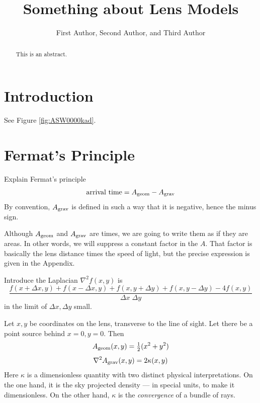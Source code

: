 \documentclass[12pt,preprint]{aastex}
\def\half{{\textstyle\frac12}}
\begin{document}
\title{Something about Lens Models}

\author{First Author,
Second Author, and
Third Author}

\begin{abstract}
This is an abstract.
\end{abstract}

\keywords{}

\section{Introduction}

See Figure \ref{fig:ASW0000kad}.

\section{Fermat's Principle}

Explain Fermat's principle
\begin{equation}
\hbox{arrival time} = A_{\rm geom} - A_{\rm grav}
\end{equation}
By convention, $A_{\rm grav}$ is defined in such a way that it is
negative, hence the minus sign.

Although $A_{\rm geom}$ and $A_{\rm grav}$ are times, we are going to
write them as if they are areas.  In other words, we will suppress a
constant factor in the $A$.  That factor is basically the lens
distance times the speed of light, but the precise expression is given
in the Appendix.

Introduce the Laplacian $\nabla^2 f(x,y)$ is
\begin{equation}
 \frac{ f(x+\Delta x, y) + f(x-\Delta x, y) +
        f(x, y+\Delta y) + f(x, y-\Delta y) - 4 f(x,y) }
      {\Delta x \; \Delta y}
\end{equation}
in the limit of $\Delta x,\Delta y$ small.

Let $x,y$ be coordinates on the lens, transverse to the line of sight.
Let there be a point source behind $x=0,y=0$.  Then
\begin{equation}
A_{\rm geom}(x,y) = \half(x^2 + y^2)
\end{equation}
\begin{equation}
\nabla^2 A_{\rm grav}(x,y) = 2\kappa(x,y)
\end{equation}
Here $\kappa$ is a dimensionless quantity with two distinct physical
interpretations.  On the one hand, it is the sky projected density ---
in special units, to make it dimensionless.  On the other hand,
$\kappa$ is the {\em convergence\/} of a bundle of rays.
\end{document}
